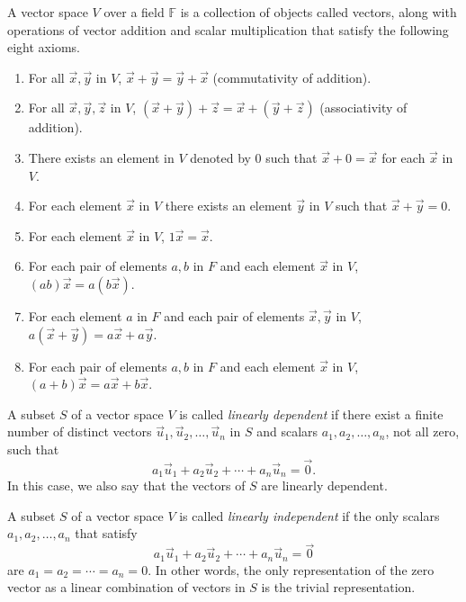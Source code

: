 \documentclass{article}
\newcommand{\F}{\mathbb{F}}
\begin{document}
\begin{definition}
     A vector space \(V\) over a field \(\F\) is a collection of objects called vectors, along with operations of vector addition and scalar multiplication that satisfy the following eight axioms. 

    \begin{enumerate}[label=\textbf{(VS \arabic*)}]
    \item  For all $\vec{x}, \vec{y}$ in $V$, $\vec{x} + \vec{y} = \vec{y} + \vec{x}$ (commutativity of addition).
    \item  For all $\vec{x}, \vec{y}, \vec{z}$ in $V$, $(\vec{x} + \vec{y}) + \vec{z} = \vec{x} + (\vec{y} + \vec{z})$ (associativity of addition).
    \item There exists an element in $V$ denoted by $0$ such that $\vec{x} + 0 = \vec{x}$ for each $\vec{x}$ in $V$.
    \item  For each element $\vec{x}$ in $V$ there exists an element $\vec{y}$ in $V$ such that $\vec{x} + \vec{y} = 0$.
    \item  For each element $\vec{x}$ in $V$, $1\vec{x} = \vec{x}$.
    \item For each pair of elements $a, b$ in $F$ and each element $\vec{x}$ in $V$, $(ab)\vec{x} = a(b\vec{x})$.
    \item For each element $a$ in $F$ and each pair of elements $\vec{x}, \vec{y}$ in $V$, $a(\vec{x} + \vec{y}) = a\vec{x} + a\vec{y}$.
    \item For each pair of elements $a, b$ in $F$ and each element $\vec{x}$ in $V$, $(a + b)\vec{x} = a\vec{x} + b\vec{x}$.
\end{enumerate}
\end{definition}

\begin{definition}
A subset \( S \) of a vector space \( V \) is called \emph{linearly dependent} if there exist a finite number of distinct vectors \( \vec{u}_1, \vec{u}_2, \ldots, \vec{u}_n \) in \( S \) and scalars \( a_1, a_2, \ldots, a_n \), not all zero, such that
\[ a_1\vec{u}_1 + a_2\vec{u}_2 + \cdots + a_n\vec{u}_n = \vec{0}. \]
In this case, we also say that the vectors of \( S \) are linearly dependent.
\end{definition}

\begin{definition}
A subset \( S \) of a vector space \( V \) is called \emph{linearly independent} if the only scalars \( a_1, a_2, \ldots, a_n \) that satisfy
\[ a_1\vec{u}_1 + a_2\vec{u}_2 + \cdots + a_n\vec{u}_n = \vec{0} \]
are \( a_1 = a_2 = \cdots = a_n = 0 \). In other words, the only representation of the zero vector as a linear combination of vectors in \( S \) is the trivial representation.
\end{definition}
\end{document}
